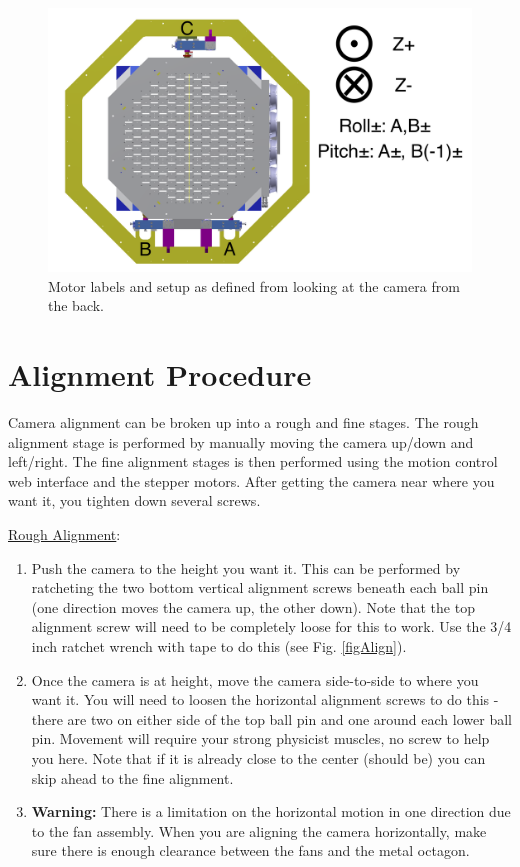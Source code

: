 \documentclass[11pt]{article}
\begin{document}
\begin{figure}[h]
\begin{center}
\includegraphics[width = 4.5in]{camerapic.png}
\caption{Motor labels and setup as defined from looking at the camera from the back.}  
\label{fd2}
\end{center}
\end{figure}


\section{Alignment Procedure}
\label{alignSec}

Camera alignment can be broken up into a rough and fine stages.
The rough alignment stage is performed by manually moving the camera up/down and left/right.
The fine alignment stages is then performed using the motion control web interface and the stepper motors.
After getting the camera near where you want it, you tighten down several screws.

\underline{Rough Alignment}:
\begin{enumerate}
	\item Push the camera to the height you want it.  
		This can be performed by ratcheting the two bottom vertical alignment screws beneath each ball pin (one direction moves the camera up, the other down).
		Note that the top alignment screw will need to be completely loose for this to work. 
		Use the 3/4 inch ratchet wrench with tape to do this (see Fig. \ref{figAlign}).
	\item Once the camera is at height, move the camera side-to-side to where you want it.
		You will need to loosen the horizontal alignment screws to do this - there are two on either side of the top ball pin and one around each lower ball pin.
		Movement will require your strong physicist muscles, no screw to help you here.
		Note that if it is already close to the center (should be) you can skip ahead to the fine alignment.
	\item {\bf Warning: }  There is a limitation on the horizontal motion in one direction due to the fan assembly.  
		When you are aligning the camera horizontally, make sure there is enough clearance between the fans and the metal octagon.
\end{enumerate}
\end{document}
